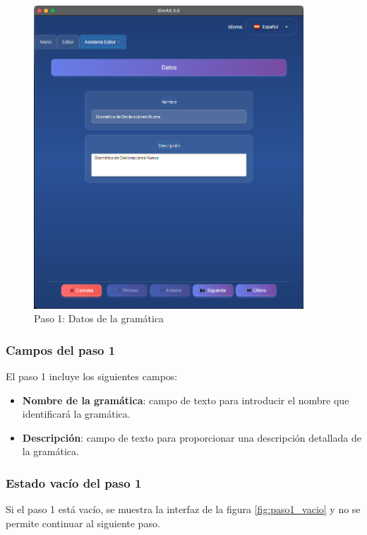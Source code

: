 \needspace{8cm}
\begin{figure}[H]
    \centering
    \includegraphics[width=0.9\textwidth]{figuras/editor/paso1_datos.png}
    \caption{Paso 1: Datos de la gramática}
    \label{fig:paso1_datos}
\end{figure}

\subsubsection{Campos del paso 1}

El paso 1 incluye los siguientes campos:

\begin{itemize}
    \item \textbf{Nombre de la gramática}: campo de texto para introducir el nombre que identificará la gramática.
    \item \textbf{Descripción}: campo de texto para proporcionar una descripción detallada de la gramática.
\end{itemize}

\subsubsection{Estado vacío del paso 1}

Si el paso 1 está vacío, se muestra la interfaz de la figura \ref{fig:paso1_vacio} y no se permite continuar al siguiente paso.

